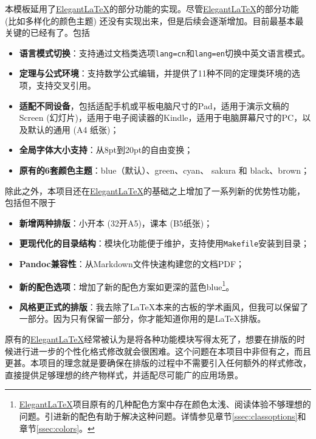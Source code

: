 本模板延用了\href{https://github.com/ElegantLaTeX/}{Elegant\LaTeX}的部分功能的实现。尽管\href{https://github.com/ElegantLaTeX/}{Elegant\LaTeX}的部分功能 (比如多样化的颜色主题) 还没有实现出来，但是后续会逐渐增加。目前最基本最关键的已经有了。包括
\begin{itemize}
  \item \textbf{语言模式切换}：支持通过文档类选项\texttt{lang=cn}和\texttt{lang=en}切换中英文语言模式。
  \item \textbf{定理与公式环境}：支持数学公式编辑，并提供了11种不同的定理类环境的选项，支持交叉引用。
  \item \textbf{适配不同设备}，包括适配手机或平板电脑尺寸的Pad，适用于演示文稿的Screen (幻灯片)，适用于电子阅读器的Kindle，适用于电脑屏幕尺寸的PC，以及默认的通用 (A4 纸张)；
  \item \textbf{全局字体大小支持}：从8pt到20pt的自由变换；
  \item \textbf{原有的6套颜色主题}：\textcolor{elegantblue}{blue}（默认）、\textcolor{elegantgreen}{green}、\textcolor{elegantcyan}{cyan}、 \textcolor{elegantsakura}{sakura} 和 \textcolor{elegantblack}{black}、\textcolor{elegantbrown}{brown}；
\end{itemize}

除此之外，本项目还在\href{https://github.com/ElegantLaTeX/}{Elegant\LaTeX}的基础之上增加了一系列新的优势性功能，包括但不限于
\begin{itemize}
  \item \textbf{新增两种排版}：小开本 (32开A5)，课本 (B5纸张)；
  \item \textbf{更现代化的目录结构}：模块化功能便于维护，支持使用\texttt{Makefile}安装到目录；
  \item \textbf{Pandoc兼容性}：从Markdown文件快速构建您的文档PDF；
  \item \textbf{新的配色选项}：增加了新的配色方案如更深的蓝色\textcolor{eblue}{blue}\footnote{\href{https://github.com/ElegantLaTeX/}{Elegant\LaTeX}项目原有的几种配色方案中存在颜色太浅、阅读体验不够理想的问题。引进新的配色有助于解决这种问题。详情参见章节\ref{ssec:classoptions}和章节\ref{ssec:colors}。}。
  \item \textbf{风格更正式的排版}：我去除了\LaTeX{}本来的古板的学术画风，但我可以保留了一部分。因为只有保留一部分，你才能知道你用的是\LaTeX{}排版。
\end{itemize}

\begin{remark}
  原有的\href{https://github.com/ElegantLaTeX/}{Elegant\LaTeX}经常被认为是将各种功能模块写得太死了，想要在排版的时候进行进一步的个性化格式修改就会很困难。这个问题在本项目中非但有之，而且更甚。本项目的理念就是要确保在排版的过程中不需要引入任何额外的样式修改，直接提供足够理想的终产物样式，并适配尽可能广的应用场景。
\end{remark}